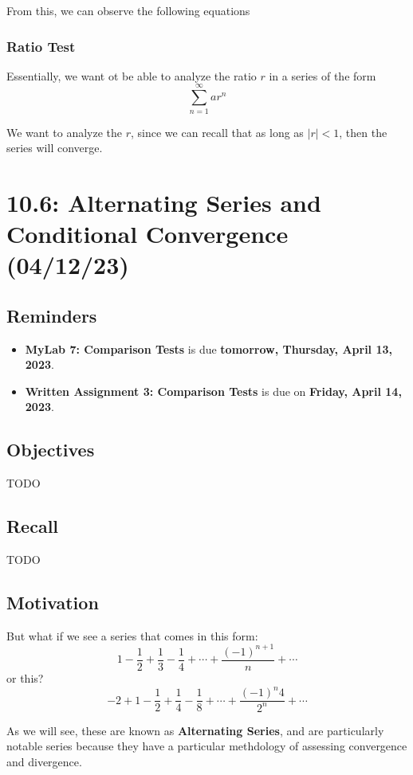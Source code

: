 \documentclass{report}
\begin{document}
\begin{sloppypar}
From this, we can observe the following equations


\subsection{Ratio Test}
Essentially, we want ot be able to analyze the ratio $ r $ in a
series of the form
\[ \sum_{n=1}^{\infty} ar^{n} \]

We want to analyze the $ r $, since we can recall that as long as $ |r| < 1 $, then
the series will converge.

\chapter{10.6: Alternating Series and Conditional Convergence (04/12/23)}

\section{Reminders}
\begin{itemize}
  \item \textbf{MyLab 7: Comparison Tests} is due
        \textbf{tomorrow, Thursday, April 13, 2023}.
  \item \textbf{Written Assignment 3: Comparison Tests}
        is due on \textbf{Friday, April 14, 2023}.
\end{itemize}

\section{Objectives}
TODO
\section{Recall}
TODO

\section{Motivation}
But what if we see a series that comes in this form:
\[ 1 - \frac{1}{2} + \frac{1}{3} - \frac{1}{4} + \cdots +
  \frac{(-1)^{n+1}}{n} + \cdots \]
or this?
\[ -2 + 1 - \frac{1}{2} + \frac{1}{4} - \frac{1}{8} +
\cdots + \frac{(-1)^{n}4}{2^{n}} + \cdots\]

As we will see, these are known as
\textbf{Alternating Series}, and are particularly notable
series because they have a particular methdology of
assessing convergence and divergence.

\end{sloppypar}
\end{document}

